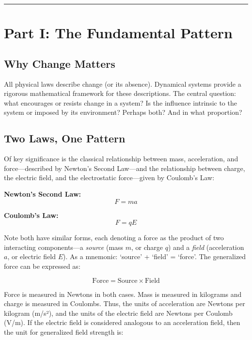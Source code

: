 \documentclass[
  letterpaper,
  DIV=11,
  numbers=noendperiod]{scrartcl}
\begin{document}
\begin{center}\rule{0.5\linewidth}{0.5pt}\end{center}

\section{Part I: The Fundamental
Pattern}\label{part-i-the-fundamental-pattern}

\subsection{Why Change Matters}\label{why-change-matters}

All physical laws describe change (or its absence). Dynamical systems
provide a rigorous mathematical framework for these descriptions. The
central question: what encourages or resists change in a system? Is the
influence intrinsic to the system or imposed by its environment? Perhaps
both? And in what proportion?

\subsection{Two Laws, One Pattern}\label{two-laws-one-pattern}

Of key significance is the classical relationship between mass,
acceleration, and force---described by Newton's Second Law---and the
relationship between charge, the electric field, and the electrostatic
force---given by Coulomb's Law:

\textbf{Newton's Second Law:} \[F = ma\]

\textbf{Coulomb's Law:} \[F = qE\]

Note both have similar forms, each denoting a force as the product of
two interacting components---a \emph{source} (mass \(m\), or charge
\(q\)) and a \emph{field} (acceleration \(a\), or electric field \(E\)).
As a mnemonic: `source' + `field' = `force'. The generalized force can
be expressed as:

\[\boxed{\text{Force} = \text{Source} \times \text{Field}}\]

Force is measured in Newtons in both cases. Mass is measured in
kilograms and charge is measured in Coulombs. Thus, the units of
acceleration are Newtons per kilogram (m/s²), and the units of the
electric field are Newtons per Coulomb (V/m). If the electric field is
considered analogous to an acceleration field, then the unit for
generalized field strength is:
\end{document}

